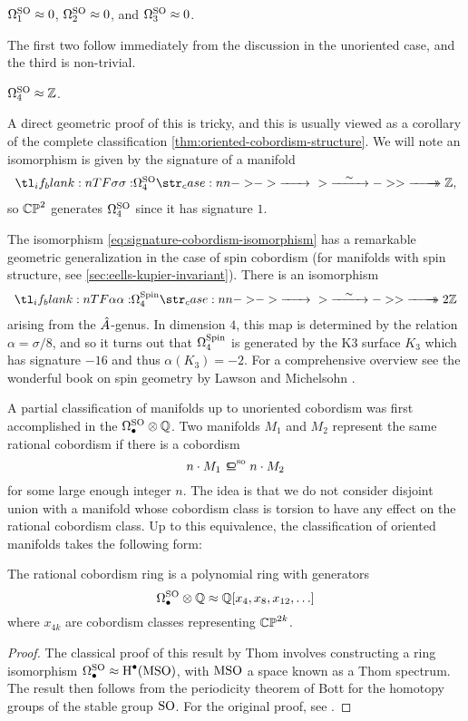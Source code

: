 \begin{example}
	$\Omega_1^{\mathrm{SO}} \approx 0$, $\Omega_2^{\mathrm{SO}} \approx 0$, and $\Omega_3^{\mathrm{SO}} \approx 0$.

	The first two follow immediately from the discussion in the unoriented case, and the third is non-trivial.
\end{example}

\begin{example}
	$\Omega_4^{\mathrm{SO}} \approx \mathbb{Z}$.

	A direct geometric proof of this is tricky, and this is usually viewed as a corollary of the complete classification \cref{thm:oriented-cobordism-structure}. 
	We will note an isomorphism is given by the signature of a manifold
	\begin{equation}\label{eq:signature-cobordism-isomorphism}
		\lkxfunc{\sigma}{\Omega_4^\SO}{\Z,}
	\end{equation}
	so $\mathbb{CP}^2$ generates $\Omega_4^{\mathrm{SO}}$ since it has signature $1$. 
\end{example}

\begin{remark*}
	The isomorphism \cref{eq:signature-cobordism-isomorphism} has a remarkable geometric generalization in the case of spin cobordism (for manifolds with spin structure, see \cref{sec:eells-kupier-invariant}). There is an isomorphism
	\[
		\lkxfunc{\alpha}{\Omega^\Spin_4}{2\Z}
	\]
	arising from the $\hat{A}$-genus. In dimension $4$, this map is determined by the relation $\alpha=\sigma/8$, and so it turns out that $\Omega^{\mathrm{Spin}}_4$ is generated by the K3 surface $K_3$ which has signature $-16$ and thus $\alpha(K_3)=-2$.
	For a comprehensive overview see the wonderful book on spin geometry by Lawson and Michelsohn \cite{lawson1989spin}.
\end{remark*}

A partial classification of manifolds up to unoriented cobordism was first accomplished in the  $\Omega_\bullet^{\mathrm{SO}}\otimes \mathbb{Q}$. Two manifolds $M_1$ and $M_2$ represent the same rational cobordism if there is a cobordism
\[
		n\cdot M_1 \sobord n\cdot M_2
\]
for some large enough integer $n$. The idea is that we do not consider disjoint union with a manifold whose cobordism class is torsion to have any effect on the rational cobordism class. Up to this equivalence, the classification of oriented manifolds takes the following form:

\begin{theorem}[Thom]\label{thm:oriented-cobordism-structure}
	The rational cobordism ring is a polynomial ring with generators
	\[
		\Omega_\bullet^{\mathrm{SO}}\otimes \mathbb{Q} \approx \mathbb{Q}[x_4, x_8, x_{12}, \ldots]
	\]
	where $x_{4k}$ are cobordism classes representing $\mathbb{CP}^{2k}$.
\end{theorem}
\begin{proof}
	The classical proof of this result by Thom involves constructing a ring isomorphism $\Omega_\bullet^{\mathrm{SO}} \approx \operatorname{H}^\bullet(\mathrm{MSO})$, with $\mathrm{MSO}$ a space known as a Thom spectrum. The result then follows from the periodicity theorem of Bott \cite{bott1959stable} for the homotopy groups of the stable group $\mathrm{SO}$.
	For the original proof, see \cite{thom1954}.
\end{proof}

